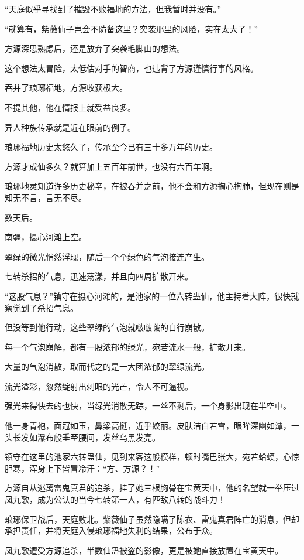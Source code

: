 \begin{this_body}
“天庭似乎寻找到了摧毁不败福地的方法，但我暂时并没有。”

“就算有，紫薇仙子岂会不防备这里？突袭那里的风险，实在太大了！”

方源深思熟虑后，还是放弃了突袭毛脚山的想法。

这个想法太冒险，太低估对手的智商，也违背了方源谨慎行事的风格。

吞并了琅琊福地，方源收获极大。

不提其他，他在情报上就受益良多。

异人种族传承就是近在眼前的例子。

琅琊福地历史太悠久了，传承至今已有三十多万年的历史。

方源才成仙多久？就算加上五百年前世，也没有六百年啊。

琅琊地灵知道许多历史秘辛，在被吞并之前，他不会和方源掏心掏肺，但现在则是知无不言，言无不尽。

数天后。

南疆，摄心河滩上空。

翠绿的微光悄然浮现，随后一个个绿色的气泡接连产生。

七转杀招的气息，迅速荡漾，并且向四周扩散开来。

“这股气息？”镇守在摄心河滩的，是池家的一位六转蛊仙，他主持着大阵，很快就察觉到了杀招气息。

但没等到他行动，这些翠绿的气泡就啵啵啵的自行崩散。

每一个气泡崩解，都有一股浓郁的绿光，宛若流水一般，扩散开来。

大量的气泡消散，取而代之的是一大团浓郁的翠绿流光。

流光溢彩，忽然绽射出刺眼的光芒，令人不可逼视。

强光来得快去的也快，当绿光消散无踪，一丝不剩后，一个身影出现在半空中。

他一身青袍，面冠如玉，鼻梁高挺，近乎姣丽。皮肤洁白若雪，眼眸深幽如潭，一头长发如瀑布般垂至腰间，发丝乌黑发亮。

镇守在这里的池家六转蛊仙，见到来客这般模样，顿时嘴巴张大，宛若蛤蟆，心惊胆寒，浑身上下皆冒冷汗：“方、方源？！”

方源自从逃离雷鬼真君的追杀，挂了她三根胸骨在宝黄天中，他的名望就一举压过凤九歌，成为公认的当今七转第一人，有匹敌八转的战斗力！

琅琊保卫战后，天庭败北。紫薇仙子虽然隐瞒了陈衣、雷鬼真君阵亡的消息，但却承担责任，并将天庭入侵琅琊福地失利的结果，公布于众。

凤九歌遭受方源追杀，半数仙蛊被盗的影像，更是被她直接放置在宝黄天中。


\end{this_body}
